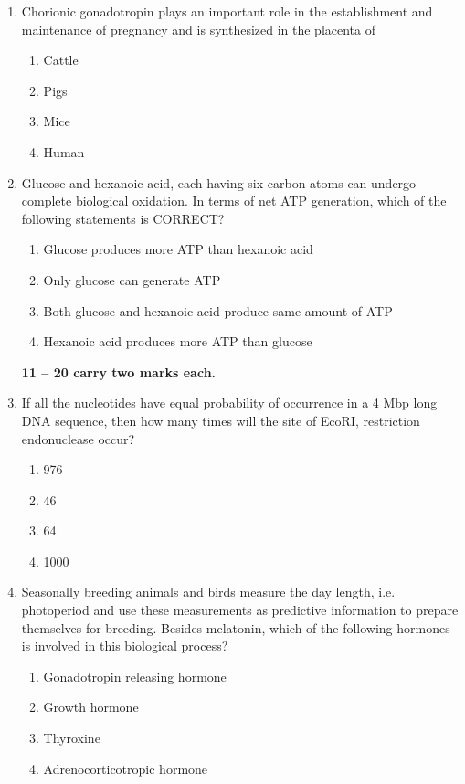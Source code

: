 \documentclass[journal,12pt,onecolumn]{IEEEtran}
\begin{document}
\begin{enumerate}[label=\arabic*.]
\item Chorionic gonadotropin plays an important role in the establishment and maintenance of pregnancy and is synthesized in the placenta of
\begin{multicols}{4}
\begin{enumerate}[label=(\Alph*)]
\item Cattle
\item Pigs
\item Mice
\item Human
\end{enumerate}
\end{multicols}

\item Glucose and hexanoic acid, each having six carbon atoms can undergo complete biological oxidation. In terms of net ATP generation, which of the following statements is CORRECT?
\begin{enumerate}[label=(\Alph*)]
\item Glucose produces more ATP than hexanoic acid
\item Only glucose can generate ATP
\item Both glucose and hexanoic acid produce same amount of ATP
\item Hexanoic acid produces more ATP than glucose
\end{enumerate}

\noindent \textbf{ 11 --  20 carry two marks each.}
\item If all the nucleotides have equal probability of occurrence in a 4 Mbp long DNA sequence, then how many times will the site of EcoRI, restriction endonuclease occur?
\begin{multicols}{4}
\begin{enumerate}[label=(\Alph*)]
\item 976
\item 46
\item 64
\item 1000
\end{enumerate}
\end{multicols}

\item Seasonally breeding animals and birds measure the day length, i.e. photoperiod and use these measurements as predictive information to prepare themselves for breeding. Besides melatonin, which of the following hormones is involved in this biological process?
\begin{multicols}{2}
\begin{enumerate}[label=(\Alph*)]
\item Gonadotropin releasing hormone
\item Growth hormone
\item Thyroxine
\item Adrenocorticotropic hormone
\end{enumerate}
\end{multicols}


\end{enumerate}
\end{document}
